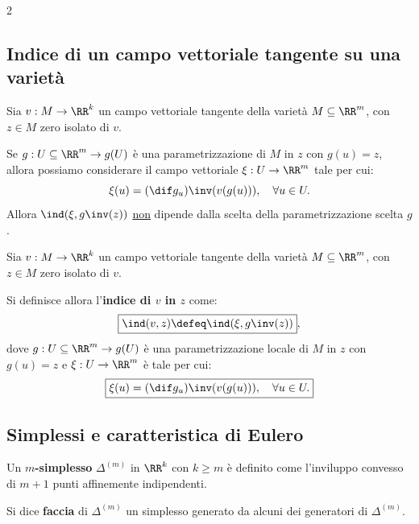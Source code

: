 \begin{multicols*}{2}
    \subsection{Indice di un campo vettoriale tangente su una varietà}

    \begin{fact}
        Sia $v : M \to \RR^k$ un campo vettoriale tangente
        della varietà $M \subseteq \RR^m$, con $z \in M$ zero isolato di $v$. \smallskip

        Se $g : U \subseteq \RR^m \to g(U)$ è una parametrizzazione di $M$ in $z$
        con $g(u) = z$,
        allora possiamo considerare il campo vettoriale
        $\xi : U \to \RR^m$ tale per cui:
        \[
            \xi(u) = (\dif g_u)\inv (v(g(u))), \quad \forall u \in U.
        \]
        Allora $\ind(\xi, g\inv(z))$ \underline{non} dipende dalla scelta
        della parametrizzazione scelta $g$.
    \end{fact}

    \begin{definition}
        Sia $v : M \to \RR^k$ un campo vettoriale tangente
        della varietà $M \subseteq \RR^m$, con $z \in M$ zero isolato di $v$. \smallskip

        Si definisce allora l'\textbf{indice di $v$ in $z$} come:
        \[
            \boxed{\ind(v, z) \defeq \ind(\xi, g\inv(z))},
        \]
        dove $g : U \subseteq \RR^m \to g(U)$ è una parametrizzazione locale di $M$ in $z$
        con $g(u) = z$ e $\xi : U \to \RR^m$ è tale per cui:
        \[
            \boxed{\xi(u) = (\dif g_u)\inv (v(g(u))), \quad \forall u \in U.}
        \]
    \end{definition}

    \subsection{Simplessi e caratteristica di Eulero}

    \begin{definition}[$m$-simplesso]
        Un \textbf{$m$-simplesso} $\Delta^{(m)}$ in $\RR^k$ con $k \geq m$ è
        definito come l'inviluppo convesso di $m+1$ punti
        affinemente indipendenti. \smallskip

        Si dice \textbf{faccia} di $\Delta^{(m)}$ un simplesso generato
        da alcuni dei generatori di $\Delta^{(m)}$.
    \end{definition}


\end{multicols*}
